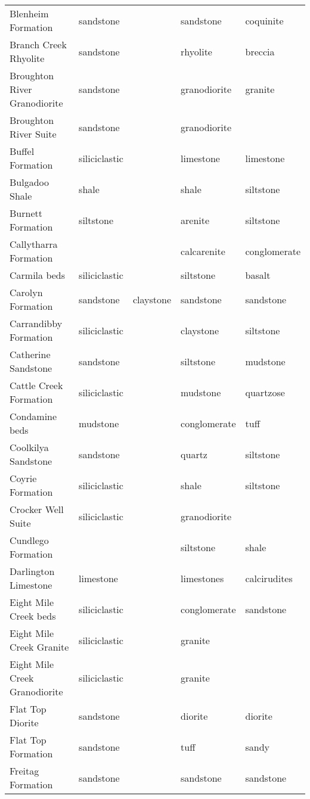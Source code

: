 \begin{tiny}
\begin{longtable}{p{5cm} l l l l}
    Blenheim Formation & sandstone &  & sandstone & coquinite \\ 
    Branch Creek Rhyolite & sandstone &  & rhyolite & breccia \\ 
    Broughton River Granodiorite & sandstone &  & granodiorite & granite \\ 
    Broughton River Suite & sandstone &  & granodiorite &  \\ 
    Buffel Formation & siliciclastic &  & limestone & limestone \\ 
    Bulgadoo Shale & shale &  & shale & siltstone \\ 
    Burnett Formation & siltstone &  & arenite & siltstone \\ 
    Callytharra Formation &  &  & calcarenite & conglomerate \\ 
    Carmila beds & siliciclastic &  & siltstone & basalt \\ 
    Carolyn Formation & sandstone & claystone & sandstone & sandstone \\ 
    Carrandibby Formation & siliciclastic &  & claystone & siltstone \\ 
    Catherine Sandstone & sandstone &  & siltstone & mudstone \\ 
    Cattle Creek Formation & siliciclastic &  & mudstone & quartzose \\ 
    Condamine beds & mudstone &  & conglomerate & tuff \\ 
    Coolkilya Sandstone & sandstone &  & quartz & siltstone \\ 
    Coyrie Formation & siliciclastic &  & shale & siltstone \\ 
    Crocker Well Suite & siliciclastic &  & granodiorite &  \\ 
    Cundlego Formation &  &  & siltstone & shale \\ 
    Darlington Limestone & limestone &  & limestones & calcirudites \\ 
    Eight Mile Creek beds & siliciclastic &  & conglomerate & sandstone \\ 
    Eight Mile Creek Granite & siliciclastic &  & granite &  \\ 
    Eight Mile Creek Granodiorite & siliciclastic &  & granite &  \\ 
    Flat Top Diorite & sandstone &  & diorite & diorite \\ 
    Flat Top Formation & sandstone &  & tuff & sandy \\ 
    Freitag Formation & sandstone &  & sandstone & sandstone \\ 

\end{longtable}
\end{tiny}
